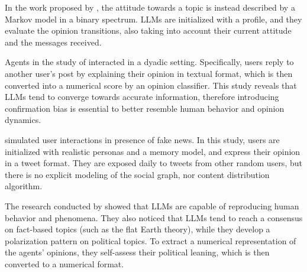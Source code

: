 In the work proposed by \citet{gao2023s3socialnetworksimulationlarge}, the attitude towards a topic is instead described by a Markov model in a binary spectrum. LLMs are initialized with a profile, and they evaluate the opinion transitions, also taking into account their current attitude and the messages received.

Agents in the study of \citet{chuang2024simulatingopiniondynamicsnetworks} interacted in a dyadic setting. Specifically, users reply to another user's post by explaining their opinion in textual format, which is then converted into a numerical score by an opinion classifier.
This study reveals that LLMs tend to converge towards accurate information, therefore introducing confirmation bias is essential to better resemble human behavior and opinion dynamics.

\citet{Liu_2024} simulated user interactions in presence of fake news. In this study, users are initialized with realistic personas and a memory model, and express their opinion in a tweet format. They are exposed daily to tweets from other random users, but there is no explicit modeling of the social graph, nor content distribution algorithm.

The research conducted by \citet{piao2025emergencehumanlikepolarizationlarge} showed that LLMs are capable of reproducing human behavior and phenomena. They also noticed that LLMs tend to reach a consensus on fact-based topics (such as the flat Earth theory), while they develop a polarization pattern on political topics.
To extract a numerical representation of the agents' opinions, they self-assess their political leaning, which is then converted to a numerical format.


